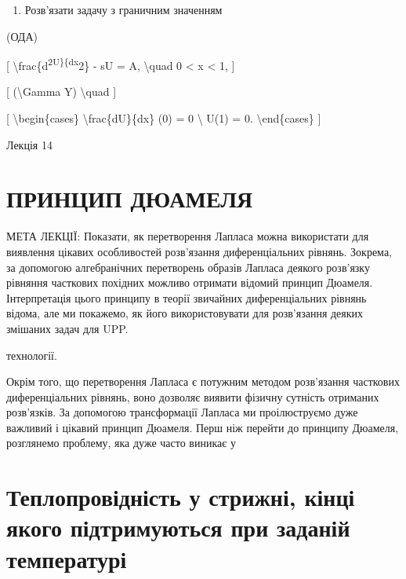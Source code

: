 \documentclass[
]{article}
\providecommand{\tightlist}{%
  \setlength{\itemsep}{0pt}\setlength{\parskip}{0pt}}
\begin{document}
\begin{enumerate}
\def\labelenumi{\arabic{enumi}.}
\setcounter{enumi}{3}
\tightlist
\item
  Розв'язати задачу з граничним значенням
\end{enumerate}

(ОДА)

{[} \textbackslash frac\{d\textsuperscript{2U\}\{dx}2\} - sU = A,
\textbackslash quad 0 \textless{} x \textless{} 1, {]}

{[} (\textbackslash Gamma Y) \textbackslash quad {]}

{[} \textbackslash begin\{cases\} \textbackslash frac\{dU\}\{dx\} (0) =
0 \textbackslash{} U(1) = 0. \textbackslash end\{cases\} {]}

Лекція 14

\section{ПРИНЦИП
ДЮАМЕЛЯ}\label{ux43fux440ux438ux43dux446ux438ux43f-ux434ux44eux430ux43cux435ux43bux44f}

МЕТА ЛЕКЦІЇ: Показати, як перетворення Лапласа можна використати для
виявлення цікавих особливостей розв'язання диференціальних рівнянь.
Зокрема, за допомогою алгебранічних перетворень образів Лапласа деякого
розв'язку рівняння часткових похідних можливо отримати відомий принцип
Дюамеля. Інтерпретація цього принципу в теорії звичайних диференціальних
рівнянь відома, але ми покажемо, як його використовувати для розв'язання
деяких змішаних задач для UPP.

технології.

Окрім того, що перетворення Лапласа є потужним методом розв'язання
часткових диференціальних рівнянь, воно дозволяє виявити фізичну
сутність отриманих розв'язків. За допомогою трансформації Лапласа ми
проілюструємо дуже важливий і цікавий принцип Дюамеля. Перш ніж перейти
до принципу Дюамеля, розглянемо проблему, яка дуже часто виникає у

\section{Теплопровідність у стрижні, кінці якого підтримуються при
заданій
температурі}\label{ux442ux435ux43fux43bux43eux43fux440ux43eux432ux456ux434ux43dux456ux441ux442ux44c-ux443-ux441ux442ux440ux438ux436ux43dux456-ux43aux456ux43dux446ux456-ux44fux43aux43eux433ux43e-ux43fux456ux434ux442ux440ux438ux43cux443ux44eux442ux44cux441ux44f-ux43fux440ux438-ux437ux430ux434ux430ux43dux456ux439-ux442ux435ux43cux43fux435ux440ux430ux442ux443ux440ux456}
\end{document}
